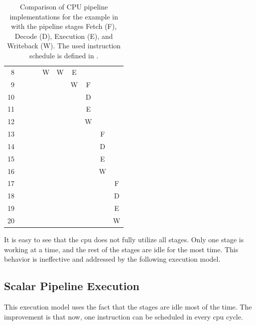 \begin{table}
{{\begin{tabular}{rccccccccc}
                 8 &   &   &   & W & W & E &   &   &   \\
                 9 &   &   &   &   &   & W & F &   &   \\ \rowcolor[gray]{.975}
                10 &   &   &   &   &   &   & D &   &   \\
                11 &   &   &   &   &   &   & E &   &   \\ \rowcolor[gray]{.975}
                12 &   &   &   &   &   &   & W &   &   \\
                13 &   &   &   &   &   &   &   & F &   \\ \rowcolor[gray]{.975}
                14 &   &   &   &   &   &   &   & D &   \\
                15 &   &   &   &   &   &   &   & E &   \\ \rowcolor[gray]{.975}
                16 &   &   &   &   &   &   &   & W &   \\
                17 &   &   &   &   &   &   &   &   & F \\ \rowcolor[gray]{.975}
                18 &   &   &   &   &   &   &   &   & D \\
                19 &   &   &   &   &   &   &   &   & E \\ \rowcolor[gray]{.975}
                20 &   &   &   &   &   &   &   &   & W \\ 
                \bottomrule
            \end{tabular}
        }
    }
    \caption[Comparison of CPU Pipeline Implementations]{Comparison of CPU pipeline implementations for the example in  with the pipeline stages Fetch (F), Decode (D), Execution (E), and Writeback (W). 
    The used instruction schedule is defined in .}
    \label{tbl:bg:pipeline}
\end{table}

It is easy to see that the \ac{cpu} does not fully utilize all stages.
Only one stage is working at a time, and the rest of the stages are idle for the most time.
This behavior is ineffective and addressed by the following execution model.

\subsection{Scalar Pipeline Execution}
This execution model uses the fact that the stages are idle most of the time.
The improvement is that now, one instruction can be scheduled in every \ac{cpu} cycle.

